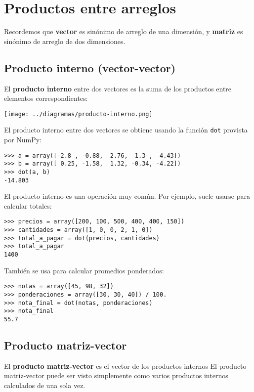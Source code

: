 \chapter{Productos entre arreglos}

Recordemos que \textbf{vector} es sinónimo de arreglo de una dimensión,
y \textbf{matriz} es sinónimo de arreglo de dos dimensiones.

\section{Producto interno (vector-vector)}

El \textbf{producto interno} entre dos vectores es la suma de los
productos entre elementos correspondientes:

\texttt{[image: ../diagramas/producto-interno.png]}

El producto interno entre dos vectores se obtiene usando la función
\lstinline!dot! provista por NumPy:

\begin{lstlisting}
>>> a = array([-2.8 , -0.88,  2.76,  1.3 ,  4.43])
>>> b = array([ 0.25, -1.58,  1.32, -0.34, -4.22])
>>> dot(a, b)
-14.803
\end{lstlisting}

El producto interno es una operación muy común. Por ejemplo, suele
usarse para calcular totales:

\begin{lstlisting}
>>> precios = array([200, 100, 500, 400, 400, 150])
>>> cantidades = array([1, 0, 0, 2, 1, 0])
>>> total_a_pagar = dot(precios, cantidades)
>>> total_a_pagar
1400
\end{lstlisting}

También se usa para calcular promedios ponderados:

\begin{lstlisting}
>>> notas = array([45, 98, 32])
>>> ponderaciones = array([30, 30, 40]) / 100.
>>> nota_final = dot(notas, ponderaciones)
>>> nota_final
55.7
\end{lstlisting}

\section{Producto matriz-vector}

El \textbf{producto matriz-vector} es el vector de los productos
internos El producto matriz-vector puede ser visto simplemente como
varios productos internos calculados de una sola vez.

